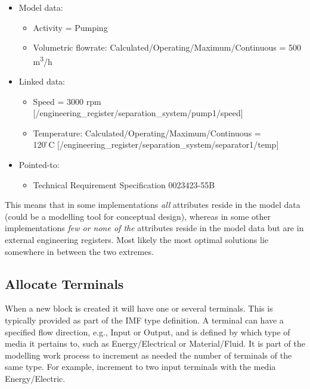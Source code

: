 \documentclass[../main.tex]{subfiles}
\begin{document}
\begin{itemize}
  \item Model data:

        \begin{itemize}
          \item Activity = Pumping
          \item Volumetric flowrate: Calculated/Operating/Maximum/Continuous = 500 m\textsuperscript{3}/h
        \end{itemize}
  \item Linked data:

        \begin{itemize}
          \item Speed = 3000 rpm [/engineering\_register/separation\_system/pump1/speed]
          \item Temperature: Calculated/Operating/Maximum/Continuous = \\ 120 {\r{}}C
                [/engineering\_register/separation\_system/separator1/temp]
        \end{itemize}
  \item Pointed-to:

        \begin{itemize}
          \item Technical Requirement Specification 0023423-55B
        \end{itemize}
\end{itemize}
This means that in some implementations \emph{all} attributes reside in the model data (could be a modelling tool
for conceptual design), whereas in some other implementations \emph{few or none of the} attributes reside in the
model data but are in external engineering registers. Most likely the most optimal solutions lie somewhere in between
the two extremes.

\subsection{Allocate Terminals}
When a new block is created it will have one or several terminals.
This is typically provided as part of the IMF type definition. A terminal can have a specified flow direction, e.g., Input or Output, and is defined by which type of media it pertains to, such as Energy/Electrical or Material/Fluid. It
is part of the modelling work process to increment as needed the number of terminals of the same type. For example,
increment to two input terminals with the media Energy/Electric.
\end{document}
